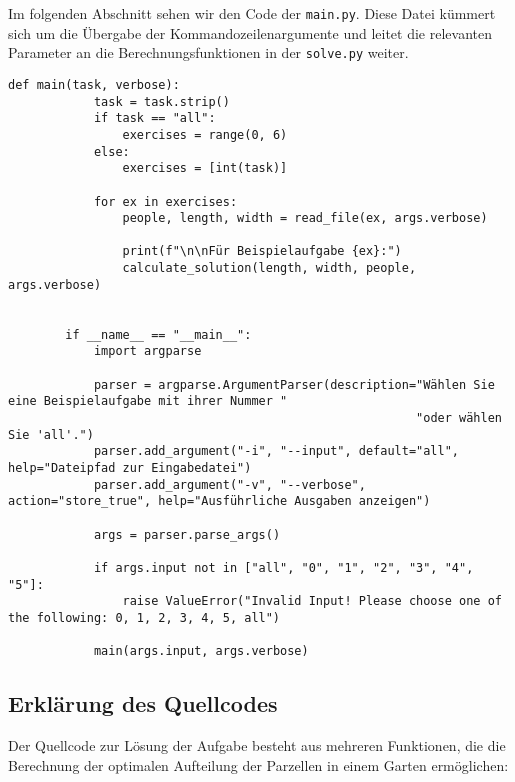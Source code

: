 \documentclass[a4paper,10pt,ngerman]{scrartcl}
\begin{document}
	Im folgenden Abschnitt sehen wir den Code der \texttt{main.py}. Diese Datei kümmert sich um die Übergabe der Kommandozeilenargumente und leitet die relevanten Parameter an die Berechnungsfunktionen in der \texttt{solve.py} weiter.

	
	\begin{lstlisting}[caption=Hauptfunktion zur Ausführung]
		def main(task, verbose):
			task = task.strip()
			if task == "all":
				exercises = range(0, 6)
			else:
				exercises = [int(task)]
			
			for ex in exercises:
				people, length, width = read_file(ex, args.verbose)
				
				print(f"\n\nFür Beispielaufgabe {ex}:")
				calculate_solution(length, width, people, args.verbose)
			
			
		if __name__ == "__main__":
			import argparse
			
			parser = argparse.ArgumentParser(description="Wählen Sie eine Beispielaufgabe mit ihrer Nummer "
														 "oder wählen Sie 'all'.")
			parser.add_argument("-i", "--input", default="all", help="Dateipfad zur Eingabedatei")
			parser.add_argument("-v", "--verbose", action="store_true", help="Ausführliche Ausgaben anzeigen")
			
			args = parser.parse_args()
			
			if args.input not in ["all", "0", "1", "2", "3", "4", "5"]:
				raise ValueError("Invalid Input! Please choose one of the following: 0, 1, 2, 3, 4, 5, all")
			
			main(args.input, args.verbose)

	\end{lstlisting}
	
	
	\subsection{Erklärung des Quellcodes}
	
	Der Quellcode zur Lösung der Aufgabe besteht aus mehreren Funktionen, die die 
	Berechnung der optimalen Aufteilung der Parzellen in einem Garten ermöglichen:
	
\end{document}
